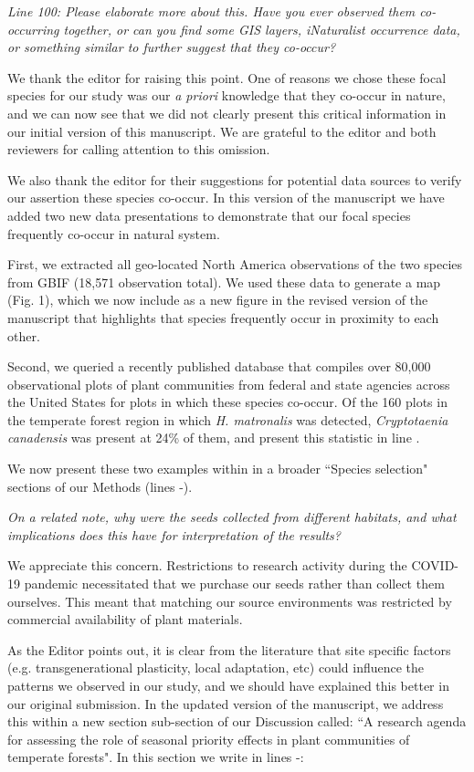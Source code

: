 \documentclass[11pt]{article}
\begin{document}
\emph{Line 100: Please elaborate more about this. Have you ever observed them co-occurring together, or can you find some GIS layers, iNaturalist occurrence data, or something similar to further suggest that they co-occur?} 

We thank the editor for raising this point. One of reasons we chose these focal species for our study was our \emph{a priori} knowledge that they co-occur in nature, and we can now see that we did not clearly present this critical information in our initial version of this manuscript. We are grateful to the editor and both reviewers for calling attention to this omission.

We also thank the editor for their suggestions for potential data sources to verify our assertion these species co-occur. In this version of the manuscript we have added two new data presentations to demonstrate that our focal species frequently co-occur in natural system. 

First, we extracted all geo-located North America observations of the two species from GBIF (18,571 observation total). We used these data to generate a map (Fig. 1), which we now include as a new figure in the revised version of the manuscript that highlights that species frequently occur in proximity to each other.

Second, we queried a recently published database that compiles over 80,000 observational plots of plant communities from federal and state agencies across the United States for plots in which these species co-occur. Of the 160 plots in the temperate forest region in which \emph{H. matronalis} was detected, \emph{Cryptotaenia canadensis} was present at 24\% of them, and present this statistic in line . %

We now present these two examples within in a broader ``Species selection" sections of our Methods (lines -).


\emph{On a related note, why were the seeds collected from different habitats, and what implications does this have for interpretation of the results?}

We appreciate this concern. Restrictions to research activity during the COVID-19 pandemic necessitated that we purchase our seeds rather than collect them ourselves. This meant that matching our source environments was restricted by commercial availability of plant materials. 

As the Editor points out, it is clear from the literature that site specific factors (e.g.  transgenerational plasticity, local adaptation, etc) could influence the patterns we observed in our study, and we should have explained this better in our original submission. In the updated version of the manuscript, we address this within a new section sub-section of our Discussion called: ``A research agenda for assessing the role of seasonal priority effects in plant communities of temperate forests". In this section we write in lines -:
\end{document}
